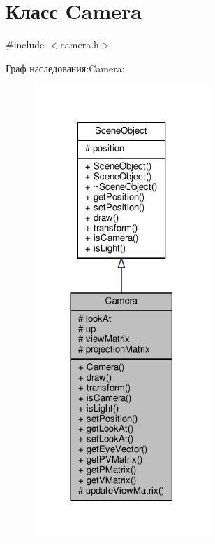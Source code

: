 \hypertarget{class_camera}{}\section{Класс Camera}
\label{class_camera}


{\ttfamily \#include $<$camera.\+h$>$}



Граф наследования\+:Camera\+:
\nopagebreak
\begin{figure}[H]
\begin{center}
\leavevmode
\includegraphics[width=189pt]{db/d34/class_camera__inherit__graph}
\end{center}
\end{figure}


